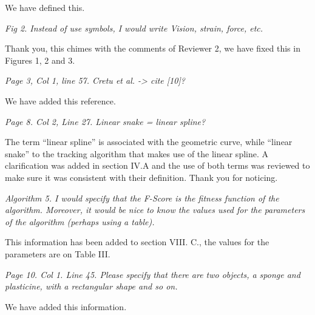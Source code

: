 \documentclass[letterpaper,12pt]{letter}
\begin{document}
We have defined this.

\emph{Fig 2. Instead of use symbols, I would write Vision, strain, force, etc.}

Thank you, this chimes with the comments of Reviewer 2, we have fixed this in Figures 1, 2 and 3.

\emph{Page 3, Col 1, line 57. Cretu et al. -> cite [10]?}

We have added this reference.

\emph{Page 8. Col 2, Line 27. Linear snake = linear spline?}

The term “linear spline” is associated with the geometric curve, while “linear snake” to the tracking algorithm that makes use of the linear spline.  A clarification was added in section IV.A and the use of both terms was reviewed to make sure it was consistent with their definition.  Thank you for noticing.

\emph{Algorithm 5. I would specify that the F-Score is the fitness function of the algorithm. Moreover, it would be nice to know the values used for the parameters of the algorithm (perhaps using a table).}

This information has been added to section VIII. C., the values for the parameters are on Table III.

\emph{Page 10. Col 1. Line 45. Please specify that there are two objects, a sponge and plasticine, with a rectangular shape and so on.}

We have added this information.
\end{document}
